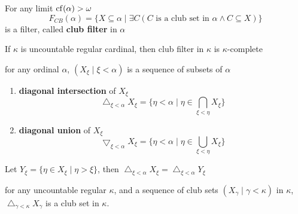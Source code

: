 \documentclass[11pt]{article}
\begin{document}
\begin{definition}[]
For any limit \(\operatorname{cf}(\alpha)>\omega\)
\begin{equation*}
F_{CB}(\alpha)=\{X\subseteq\alpha\mid\exists C(C\text{ is a club set in }\alpha\wedge C\subseteq X)\}
\end{equation*}
is a filter, called \textbf{club filter} in \(\alpha\)
\end{definition}

\begin{corollary}[]
\label{3.3.9}
If \(\kappa\) is uncountable regular cardinal, then club filter in \(\kappa\) is \(\kappa\)-complete
\end{corollary}

\begin{definition}[]
for any ordinal \(\alpha\), \((X_\xi\mid\xi<\alpha)\) is a sequence of subsets of \(\alpha\)
\begin{enumerate}
\item \textbf{diagonal intersection} of \(X_\xi\)
\begin{equation*}
\bigtriangleup_{\xi<\alpha}X_\xi=\{\eta<\alpha\mid\eta\in\bigcap_{\xi<\eta}X_\xi\}
\end{equation*}
\item \textbf{diagonal union} of \(X_\xi\)
\begin{equation*}
\bigtriangledown_{\xi<\alpha}X_\xi=\{\eta<\alpha\mid\eta\in\bigcup_{\xi<\eta}X_\xi\}
\end{equation*}
\end{enumerate}
\end{definition}

\begin{remark}
Let \(Y_\xi=\{\eta\in X_\xi\mid\eta>\xi\}\), then \(\bigtriangleup_{\xi<\alpha}X_\xi=\bigtriangleup_{\xi<\alpha}Y_\xi\)
\end{remark}

\begin{proposition}[]
for any uncountable regular \(\kappa\), and a sequence of club sets \((X_\gamma\mid\gamma<\kappa)\) in \(\kappa\), \(\bigtriangleup_{\gamma<\kappa}X_\gamma\) is a
club set in \(\kappa\).
\end{proposition}
\end{document}
